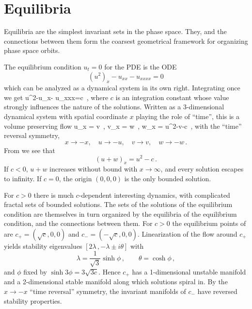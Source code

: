 
\section{Equilibria} %
\label{sec:stks}


\noindent
Equilibria 
are the simplest invariant sets in
the phase space. They,  and 
the connections between them form the
coarsest geometrical framework for organizing
phase space orbits. %

The equilibrium condition $u_t=0$ for the {\KSe} PDE  
is the ODE
\[
(u^2)_x-u_{xx}- u_{xxxx}=0 
\]
which can be analyzed as a dynamical system in its own right.
Integrating once we get
\beq
u^2-u_x- u_{xxx}=c 
\,,
\label{eq:stdks}
\eeq
where $c$ is an integration constant 
whose value strongly influences the nature of
the solutions. %
Written as a 3-dimensional dynamical system
with spatial coordinate $x$ playing the role of ``time'',
this is a volume preserving flow
\beq
u_x = v \,,\qquad
v_x = w \,,\qquad
w_x = u^2-v-c \,,
  \label{eq:3dks}
\eeq
with the ``time'' reversal symmetry, 
\[
x \to -x,\quad u \to -u, \quad v \to v, \quad w \to -w \,.
\]
 From  we see that
\[
(u+w)_x=u^2-c \,.
\]
If $c<0$, $u+w$ increases without bound with $x \to \infty$,
and every solution escapes to infinity.
If $c=0$, the origin $(0,0,0)$ is the
only bounded solution. 

For $c>0$ there is much
$c$-dependent interesting dynamics, with
complicated fractal sets of bounded solutions.
The sets of the solutions of the equilibrium condition 
 are themselves in turn organized by the  
equilibria of the equilibrium condition, and 
the connections between them.
    For $c>0$ the equilibrium points of  are
$c_{+}=(\sqrt{c},0,0)$ and $c_{-}=(-\sqrt{c},0,0)$.
Linearization of the flow around
$c_{+}$ yields 
stability eigenvalues 
$[ 2\lambda \,, -\lambda \pm i \theta ]$
with 
\[
\lambda=\frac{1}{\sqrt{3}}\sinh \phi
\,,\qquad
\theta=\cosh \phi \, ,
\]
and $\phi$ fixed by $\sinh 3\phi=3\sqrt{3c}$. 
Hence $c_{+}$ has a {1-dimensional}
unstable manifold and a 2-dimensional
stable manifold along which solutions spiral 
in. 
By the $x \to -x$ ``time reversal'' symmetry, the 
invariant manifolds of $c_{-}$ 
have reversed stability properties.

